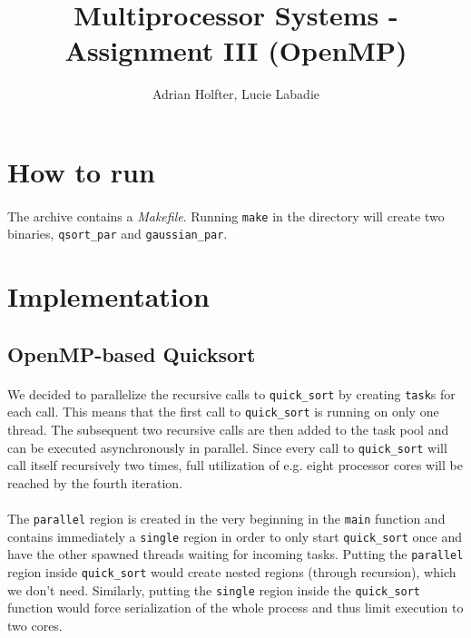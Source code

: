 \documentclass[]{article}
\title{Multiprocessor Systems - Assignment III (OpenMP)}
\author{Adrian Holfter, Lucie Labadie}
\begin{document}
\maketitle

\section{How to run}

\paragraph{} The archive contains a \emph{Makefile}. Running \texttt{make} in the directory will create two binaries, \texttt{qsort\_par} and \texttt{gaussian\_par}.

\section{Implementation}

\subsection{OpenMP-based Quicksort}

\paragraph{} We decided to parallelize the recursive calls to \texttt{quick\_sort} by creating \texttt{task}s for each call. This means that the first call to \texttt{quick\_sort} is running on only one thread. The subsequent two recursive calls are then added to the task pool and can be executed asynchronously in parallel. Since every call to \texttt{quick\_sort} will call itself recursively two times, full utilization of e.g. eight processor cores will be reached by the fourth iteration.

\paragraph{} The \texttt{parallel} region is created in the very beginning in the \texttt{main} function and contains immediately a \texttt{single} region in order to only start \texttt{quick\_sort} once and have the other spawned threads waiting for incoming tasks. Putting the \texttt{parallel} region inside \texttt{quick\_sort} would create nested regions (through recursion), which we don't need. Similarly, putting the \texttt{single} region inside the \texttt{quick\_sort} function would force serialization of the whole process and thus limit execution to two cores.
\end{document}
